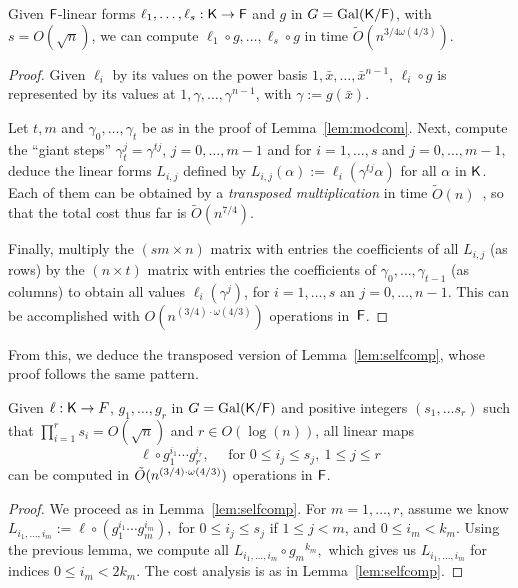 \begin{lemma}
  \label{lem:modcomT}
  Given ${\mathsf{F}}$-linear forms $\ell_1,\dots,\ell_s:{\mathsf{K}}\to {\mathsf{F}}$ and $g$ in $G =
  \mathrm{Gal}({\mathsf{K}}/{\mathsf{F}})$, with $s = O(\sqrt{n})$, we can compute
  $\ell_1\circ g,\dots,\ell_s \circ g$ in time $\tilde
  O(n^{{3}/{4}\omega({4}/{3})})$.
\end{lemma}
\begin{proof}
  Given $\ell_i$ by its values on the power basis $1,\bar x,\dots,\bar
  x^{n-1}$, $\ell_i \circ g$ is represented by its values at
  $1,\gamma,\dots,\gamma^{n-1}$, with $\gamma := g(\bar x)$. 

  Let $t,m$ and $\gamma_0,\dots,\gamma_t$ be as in the proof of
  Lemma~\ref{lem:modcom}. Next, compute the ``giant steps''
  $\gamma_t^j = \gamma^{tj}$, $j=0,\dots,m-1$ and for $i=1,\dots,s$
  and $j=0,\dots,m-1$, deduce the linear forms $L_{i,j}$ defined by
  $L_{i,j}(\alpha) := \ell_i(\gamma^{tj}\alpha)$ for all $\alpha$ in
  ${\mathsf{K}}$. Each of them can be obtained by a {\em transposed
    multiplication} in time $\tilde{O}(n)$~\cite[Section~4.1]{Shoup},
  so that the total cost thus far is $\tilde{O}(n^{7/4})$.

  Finally, multiply the $(sm \times n)$ matrix with entries the
  coefficients of all $L_{i,j}$ (as rows) by the $(n \times t)$ matrix with
  entries the coefficients of $\gamma_0,\dots,\gamma_{t-1}$ (as columns) to
  obtain all values $\ell_i(\gamma^j)$, for $i=1,\dots,s$ an
  $j=0,\dots,n-1$.  This can be accomplished with
  $O(n^{(3/4)\cdot\omega(4/3)})$ operations in~${\mathsf{F}}$.
\end{proof}

From this, we deduce the transposed version of Lemma~\ref{lem:selfcomp},
whose proof follows the same pattern.

\begin{lemma}
  \label{lem:transmodcomp}
  Given $\ell:{\mathsf{K}}\to F$, $g_1, \ldots , g_{r}$ in $G = \mathrm{Gal}({\mathsf{K}}/{\mathsf{F}})$
  and positive integers $(s_1, \ldots s_r)$ such that
  $\prod_{i = 1}^r s_i = O(\sqrt{n})$ and $r \in O(\log(n))$, all linear
  maps
  \[
    \ell \circ g_1^{i_1}\cdots g_r^{i_r} ,\quad \text{~for~} 0 \leq i_j
    \leq s_j,\ 1 \leq j \leq r
  \]
  can be computed in $\tilde{O}(n^{(3/4)\cdot \omega(4/3)})$ operations in ${\mathsf{F}}$.
\end{lemma} 
\begin{proof}
  We proceed as in Lemma~\ref{lem:selfcomp}. For $m=1,\dots,r$, assume
  we know $L_{i_1,\dots,i_m}:=\ell \circ (g_1^{i_1}\cdots g_m^{i_m}),$
  for $0 \leq i_j \leq s_j$ if $1 \leq j < m$, and $0 \leq i_m < k_m.$
  Using the previous lemma, we compute all $L_{i_1,\dots,i_m} \circ
  {g_m}^{k_m},$ which gives us $L_{i_1,\dots,i_m}$ for indices $0 \le
  i_m < 2k_m$. The cost analysis is as in Lemma~\ref{lem:selfcomp}.
\end{proof}

